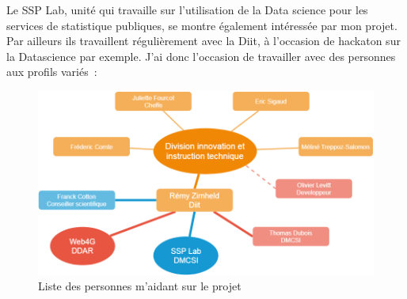 Le SSP Lab, unité qui travaille sur l'utilisation de la Data science pour les services de statistique publiques, se montre également intéressée par mon projet. Par ailleurs ils travaillent régulièrement avec la Diit, à l'occasion de hackaton sur la Datascience par exemple. J'ai donc l'occasion de travailler avec des personnes aux profils variés~:
\vspace{10pt}
\begin{figure}[H]
  \centering
  \includegraphics[scale=0.45]{images/Organigramme-stage.png}
  \caption{Liste des personnes m'aidant sur le projet}
  \label{fig:Organigramme}
\end{figure}

\vspace{20pt}

